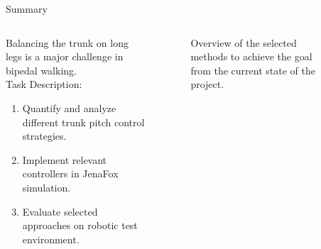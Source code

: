 \begin{frame}{Summary}%
    \begin{columns}[T,onlytextwidth]%
        \begin{column}[T]{0.48\textwidth}%
            Balancing the trunk on long legs is a major challenge in bipedal walking.\\
            Task Description:
            \begin{enumerate}
                \item Quantify and analyze different trunk pitch control strategies.
                \item Implement relevant controllers in JenaFox simulation.
                \item Evaluate selected approaches on robotic test environment.
            \end{enumerate}%
        \end{column}%
        \begin{column}[T]{0.48\textwidth}%
            \begin{figure}[htb]%
                \centering%
                \caption{Overview of the selected methods to achieve the goal from the current state of the project.}%
                \label{fig:objective}%
            \end{figure}%
        \end{column}%
    \end{columns}%
\end{frame}%
%